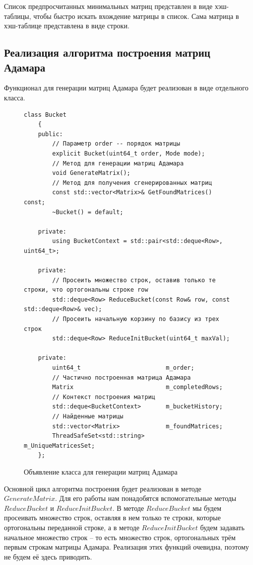 \documentclass[a4paper, 14pt]{extreport}
\begin{document}
Список предпросчитанных минимальных матриц представлен в виде хэш-таблицы, чтобы быстро искать вхождение матрицы в список. Сама матрица в хэш-таблице представлена в виде строки.

\subsection{Реализация алгоритма построения матриц Адамара}
\label{builder_s}

Функционал для генерации матриц Адамара будет реализован в виде отдельного класса.

\begin{figure}[H]
    \centering
    \begin{minipage}{\linewidth}
    \begin{lstlisting}[language=С++, tabsize=4, showspaces=false, basicstyle=\fontsize{9.5}{11.5}\selectfont, numbers=none]
    class Bucket
    {
    public:
        // Параметр order -- порядок матрицы
        explicit Bucket(uint64_t order, Mode mode);
        // Метод для генерации матриц Адамара
        void GenerateMatrix();
        // Метод для получения сгенерированных матриц
        const std::vector<Matrix>& GetFoundMatrices() const;
        ~Bucket() = default;
    
    private:
        using BucketContext = std::pair<std::deque<Row>, uint64_t>;
    
    private:
        // Просеить множество строк, оставив только те строки, что ортогональны строке row
        std::deque<Row> ReduceBucket(const Row& row, const std::deque<Row>& vec);
        // Просеить начальную корзину по базису из трех строк
        std::deque<Row> ReduceInitBucket(uint64_t maxVal);
    
    private:
        uint64_t                        m_order;
        // Частично построенная матрица Адамара
        Matrix                          m_completedRows;
        // Контекст построения матриц
        std::deque<BucketContext>       m_bucketHistory;
        // Найденные матрицы
        std::vector<Matrix>             m_foundMatrices;
        ThreadSafeSet<std::string>      m_UniqueMatricesSet;
    };
    \end{lstlisting}
    \end{minipage}
    \caption{Объявление класса для генерации матриц Адамара}
    \label{alg:builder_definition}
\end{figure}

Основной цикл алгоритма построения будет реализован в методе $GenerateMatrix$. Для его работы нам понадобятся вспомогательные методы $ReduceBucket$ и $ReduceInitBucket$. В методе $ReduceBucket$ мы будем просеивать множество строк, оставляя в нем только те строки, которые ортогональны переданной строке, а в методе $ReduceInitBucket$ будем задавать начальное множество строк -- то есть множество строк, ортогональных трём первым строкам матрицы Адамара. Реализация этих функций очевидна, поэтому не будем её здесь приводить.
\end{document}
